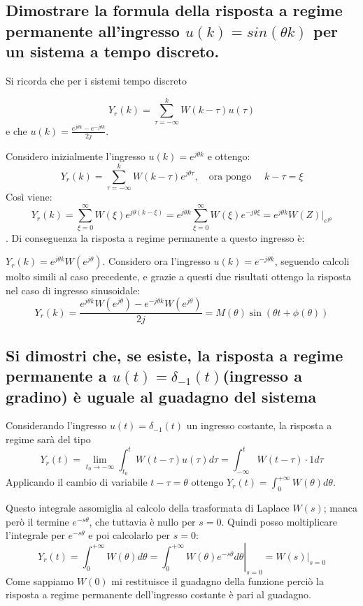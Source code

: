 \documentclass{article}
\begin{document}
\subsection{\boldmath Dimostrare la formula della risposta a regime permanente all'ingresso $u(k) = sin(\theta k)$ per un sistema a tempo discreto.}
Si ricorda che per i sistemi tempo discreto

\[Y_r(k)=\sum_{\tau =- \infty}^{k} W(k-\tau)u(\tau)\]e che
$u(k)=\frac {e^{j\theta k} - e^{-j\theta k}}{2j} $.


Considero inizialmente l'ingresso $u(k)=e^{j \theta k}$ e ottengo:
\[ 
    Y_r(k)=\sum_{\tau =- \infty}^{k} W(k-\tau)e^{j\theta \tau},
    \quad \text{ora pongo }\quad k-\tau=\xi
\]
Così viene:
\[ Y_r(k)=\sum_{\xi =0}^{\infty} W(\xi)e^{j\theta (k-\xi)} = e^{j\theta k} \sum_{\xi =0}^{\infty} W(\xi)e^{-j\theta \xi}
= e^{j\theta k} W(Z)|_{e^{j \theta}} \].
Di conseguenza la risposta a regime permanente a questo ingresso è:

$Y_r(k)=e^{j \theta k}W(e^{j \theta})$.
Considero ora l'ingresso $u(k)=e^{-j \theta k}$, seguendo calcoli molto simili al caso precedente,
e grazie a questi due risultati ottengo la risposta
nel caso di ingresso sinusoidale:
\[
    Y_r(k)=\frac{e^{j \theta k}W(e^{j \theta})-e^{-j \theta k}W(e^{j \theta})}{2j}
    = M(\theta)\sin(\theta t +\phi(\theta))
\]


\subsection{\boldmath Si dimostri che, se esiste, la risposta a regime permanente a $u(t) = \delta _{-1}(t)$(ingresso a gradino) è uguale al guadagno del sistema}
Considerando l'ingresso $u(t) = \delta_{-1}(t)$ un ingresso costante,
la risposta a regime sarà del tipo 
\[ 
    Y_r(t)= \lim_{t_0 \to -\infty} \int_{t_0}^{t}W(t-\tau)u(\tau)d\tau=\int_{-\infty}^{t}W(t-\tau)\cdot 1 d\tau
\]
Applicando il cambio di variabile $t-\tau = \theta$ ottengo $Y_r(t)=\int_{0}^{+\infty}W(\theta) d\theta$.

Questo integrale assomiglia al calcolo della trasformata di Laplace $W(s)$;
manca però il termine $e^{-s\theta}$, che tuttavia è nullo per $s=0$.
Quindi posso moltiplicare l'integrale per  $e^{-s\theta}$ e poi calcolarlo per $s=0$:
\[ 
    Y_r(t)=\int_{0}^{+\infty}W(\theta) d\theta =\left. \int_{0}^{+\infty}W(\theta) e^{-s\theta} d\theta \right|_{s=0} =\left. W(s)\right|_{s=0}
\]
Come sappiamo $W(0)$ mi restituisce il guadagno della funzione perciò la risposta a regime permanente dell'ingresso costante è pari al guadagno.
\end{document}
